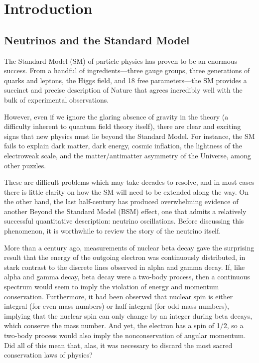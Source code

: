 \documentclass[../thesis.tex]{subfiles}
\begin{document}
\chapter{Introduction}
\label{chap:intro}

\section{Neutrinos and the Standard Model}
\label{sec:neuAndSM}

The Standard Model (SM) of particle physics has proven to be an enormous success. From a handful of ingredients---three gauge groups, three generations of quarks and leptons, the Higgs field, and 18 free parameters---the SM provides a succinct and precise description of Nature that agrees incredibly well with the bulk of experimental observations.

However, even if we ignore the glaring absence of gravity in the theory (a difficulty inherent to quantum field theory itself), there are clear and exciting signs that new physics must lie beyond the Standard Model. For instance, the SM fails to explain dark matter, dark energy, cosmic inflation, the lightness of the electroweak scale, and the matter/antimatter asymmetry of the Universe, among other puzzles.

These are difficult problems which may take decades to resolve, and in most cases there is little clarity on how the SM will need to be extended along the way. On the other hand, the last half-century has produced overwhelming evidence of another Beyond the Standard Model (BSM) effect, one that admits a relatively successful quantitative description: neutrino oscillations. Before discussing this phenomenon, it is worthwhile to review the story of the neutrino itself. 

More than a century ago, measurements of nuclear beta decay gave the surprising result that the energy of the outgoing electron was continuously distributed, in stark contrast to the discrete lines observed in alpha and gamma decay. If, like alpha and gamma decay, beta decay were a two-body process, then a continuous spectrum would seem to imply the violation of energy and momentum conservation. Furthermore, it had been observed that nuclear spin is either integral (for even mass numbers) or half-integral (for odd mass numbers), implying that the nuclear spin can only change by an integer during beta decays, which conserve the mass number. And yet, the electron has a spin of 1/2, so a two-body process would also imply the nonconservation of angular momentum. Did all of this mean that, alas, it was necessary to discard the most sacred conservation laws of physics?
\end{document}
